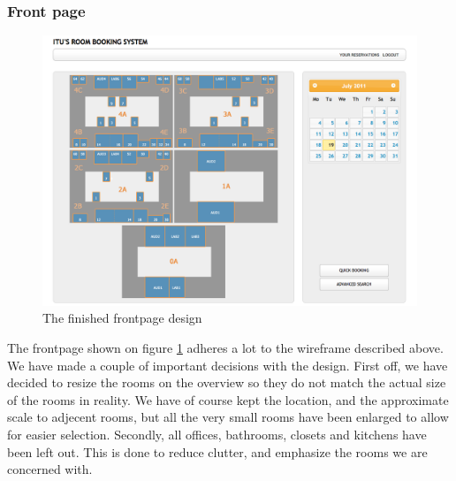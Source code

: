 \subsubsection*{Front page}
\begin{figure}[htb]
\begin{center}
\leavevmode
\includegraphics[width=1\textwidth]{images/frontpage}
\end{center}
\caption{The finished frontpage design}
\label{fig:frontpage}
\end{figure}
The frontpage shown on figure \ref{fig:frontpage} adheres a lot to the wireframe described above. 
We have made a couple of important decisions with the design. First off, we have decided to resize the rooms on the overview so they do not match the actual size of the rooms in reality. We have of course kept the location, and the approximate scale to adjecent rooms, but all the very small rooms have been enlarged to allow for easier selection.
Secondly, all offices, bathrooms, closets and kitchens have been left out. This is done to reduce clutter, and emphasize the rooms we are concerned with.

\pagebreak
